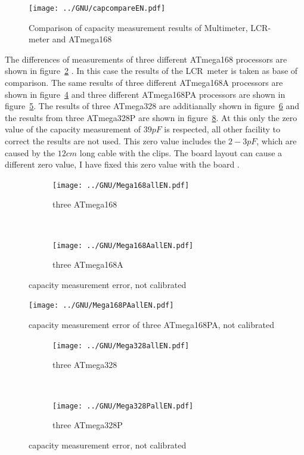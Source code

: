 \begin{figure}[H]
\centering
\texttt{[image: ../GNU/capcompareEN.pdf]}
\caption{Comparison of capacity measurement results of Multimeter, LCR-meter and ATmega168}
\label{fig:capcompare}
\end{figure}

The differences of measurements of three different ATmega168 processors are shown in figure~\ref{fig:mega168all} .
In this case the results of the LCR~meter is taken as base of comparison.
The same results of three different ATmega168A processors are shown in figure~\ref{fig:mega168Aall} and
three different ATmega168PA processors are shown in figure~\ref{fig:mega168PAall}.
The results of three ATmega328 are additianally shown in figure~\ref{fig:mega328all} and the results from three
ATmega328P are shown in figure~\ref{fig:mega328Pall}.
At this only the zero value of the capacity measurement of \(39pF\) is respected, all other facility to correct the results are
not used.
This zero value includes the \(2-3pF\), which are caused by the \(12cm\) long cable with the clips.
The board layout can cause a different zero value, I have fixed this zero value with the board .

\begin{figure}[H]
  \begin{subfigure}[b]{.5\textwidth}
    \centering
    \texttt{[image: ../GNU/Mega168allEN.pdf]}
    \caption{three ATmega168}
    \label{fig:mega168all}
  \end{subfigure}
  ~
  \begin{subfigure}[b]{.5\textwidth}
    \centering
    \texttt{[image: ../GNU/Mega168AallEN.pdf]}
    \caption{three ATmega168A}
    \label{fig:mega168Aall}
  \end{subfigure}
\caption{capacity measurement error, not calibrated}
\end{figure}

\begin{figure}[H]
\centering
\texttt{[image: ../GNU/Mega168PAallEN.pdf]}
\caption{capacity measurement error of three ATmega168PA, not calibrated}
\label{fig:mega168PAall}
\end{figure}

\begin{figure}[H]
  \begin{subfigure}[b]{.5\textwidth}
    \centering
    \texttt{[image: ../GNU/Mega328allEN.pdf]}
    \caption{three ATmega328}
    \label{fig:mega328all}
  \end{subfigure}
  ~
  \begin{subfigure}[b]{.5\textwidth}
    \centering
    \texttt{[image: ../GNU/Mega328PallEN.pdf]}
    \caption{three ATmega328P}
    \label{fig:mega328Pall}
  \end{subfigure}
\caption{capacity measurement error, not calibrated}
\end{figure}

